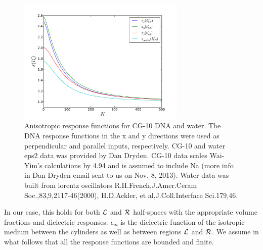 \documentclass[onecolumn,letterpaper,amsmath,amssymb,floatfix,aps,superscriptaddress]{revtex4}
\begin{document}
\begin{figure}
\centerline{\includegraphics[width=8cm]{./140220_cyl-cyl/eiz.pdf}}
\caption{\label{fig:1} Anisotropic response functions for CG-10 DNA and water. The DNA response functions in the x and y directions were used as perpendicular and parallel inputs, respectively.  CG-10 and water eps2 data was provided by Dan Dryden. CG-10 data scales Wai-Yim's calculations by 4.94 and is assumed to include Na (more info in Dan Dryden email sent to us on Nov. 8, 2013).  Water data was built from lorentz oscillators R.H.French,J.Amer.Ceram Soc.,83,9,2117-46(2000), H.D.Ackler, et al,J.Coll.Interface Sci.179,46. }
\end{figure}

In our case, this holds for both ${\cal L}$ and ${\cal R}$ half-spaces with the appropriate volume fractions and dielectric responses. $\epsilon_{m}$ is the dielectric function of the 
isotropic medium between the cylinders as well as between regions ${\cal L}$ and ${\cal R}$. We assume in what follows that all the response functions are bounded and finite.
 
\end{document}
